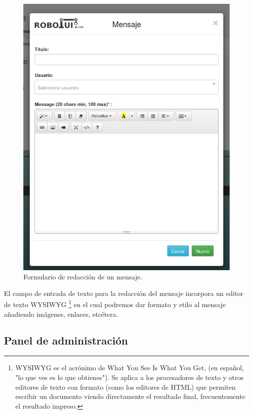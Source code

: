 \begin{figure}[H]
  \begin{center}
    \includegraphics[scale=.35]{imagenes/manual-usuario/formulario-mensaje.png}
  \end{center}
  \caption{ Formulario de redacción de un mensaje.}
  \label{website:formulario-mensaje}
\end{figure}


El campo de entrada de texto para la redacción del mensaje incorpora un editor de texto WYSIWYG \footnote{ WYSIWYG es el acrónimo de What You See Is What You Get, (en español, "lo que ves es lo
que obtienes"). Se aplica a los procesadores de texto y otros editores de texto con formato (como los editores de HTML) que permiten escribir un documento viendo directamente el resultado final,
frecuentemente el resultado impreso.} en el cual podremos dar formato y etilo al mensaje añadiendo imágenes, enlaces, etcétera.


\subsection{Panel de administración}


